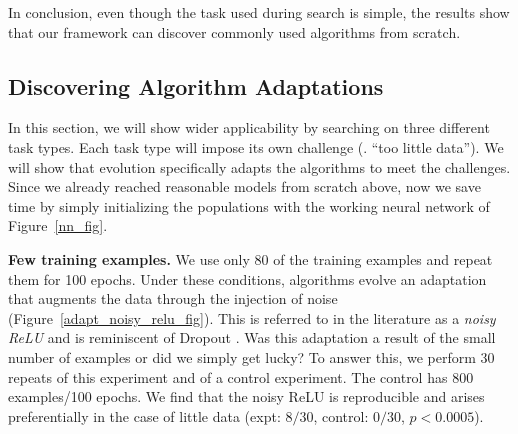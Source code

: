 In conclusion, even though the task used during search is simple, the results
show that our framework can discover commonly used algorithms from scratch. 

\subsection{Discovering Algorithm Adaptations}
\label{zoo_sec}

In this section, we will show wider applicability by searching on three different task types. Each task type will impose its own challenge (\eg. ``too little data''). We will show that evolution specifically adapts the algorithms to meet the challenges. Since we already reached reasonable models from scratch above, now we save time by simply initializing the populations with the working neural network of Figure~\ref{nn_fig}.


\textbf{Few training examples.} We use only 80 of the training examples and repeat them for 100 epochs. Under these conditions, algorithms evolve an adaptation that augments the data through the injection of noise (Figure~\ref{adapt_noisy_relu_fig}). This is referred to in the literature as a \textit{noisy ReLU} \cite{nair2010rectified,bengio2013estimating} and is reminiscent of Dropout \cite{srivastava2014dropout}. Was this adaptation a result of the small number of examples or did we simply get lucky? To answer this, we perform $30$ repeats of this experiment and of a control experiment. The control has $800$ examples/100 epochs. We find that the noisy ReLU is reproducible and arises preferentially in the case of little data
(expt: $8/30$, control: $0/30$, $p\!<\!0.0005$).

